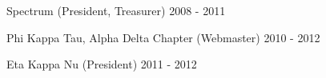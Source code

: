 \documentclass[10pt, letterpaper]{article}
\begin{document}
\bigskip







Spectrum (President, Treasurer) \hfill 2008 - 2011

Phi Kappa Tau, Alpha Delta Chapter (Webmaster) \hfill 2010 - 2012

Eta Kappa Nu (President) \hfill 2011 - 2012
\end{document}
